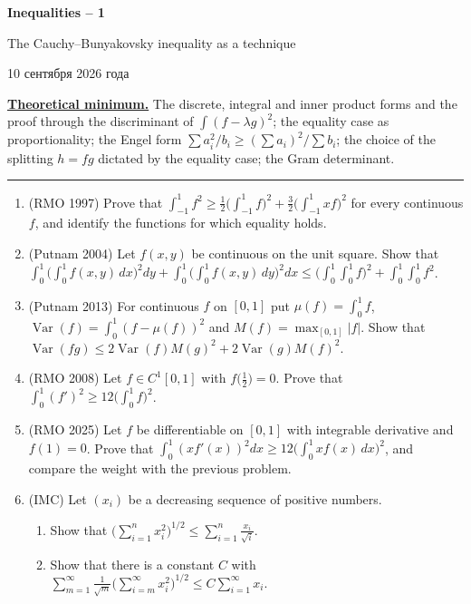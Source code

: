 \documentclass[11pt,a4paper]{article}
\newcommand{\head}[1]{\par\noindent\textbf{\underline{#1}}\quad}
\newcommand{\sheettitle}[4]{%
  \begin{center}
  {\huge\bfseries #1\par}\vspace{\dimexpr1.2em-1pt\relax minus 3.6pt}
  {\Large #2\par}\vspace{\dimexpr1em+1pt\relax minus 1.2pt}
  \if\relax\detokenize{#3}\relax\else{\Large #3\par}\vspace{\dimexpr1.15em-1pt\relax minus 3.6pt}\fi
  {\foreignlanguage{russian}{#4}\par}
  \end{center}\vspace{0.5pt minus 1.2pt}}
\DeclareMathOperator{\Var}{Var}
\begin{document}
\sheettitle{Inequalities -- 1}{The Cauchy--Bunyakovsky inequality as a technique}{Homework}{10 сентября 2026 года}

\head{Theoretical minimum.} The discrete, integral and inner product forms and the proof through
the discriminant of $\int(f-\lambda g)^2$; the equality case as proportionality; the Engel form
$\sum a_i^2/b_i\geqslant(\sum a_i)^2/\sum b_i$; the choice of the splitting $h=fg$ dictated by the
equality case; the Gram determinant.

\par\vspace{-1pt}\noindent\rule{\linewidth}{0.4pt}\par\vspace{14pt}

\begin{enumerate}
\item (RMO 1997) Prove that
$\int_{-1}^1f^2\geqslant\frac12\bigl(\int_{-1}^1f\bigr)^2+\frac32\bigl(\int_{-1}^1xf\bigr)^2$ for
every continuous $f$, and identify the functions for which equality holds.

\item (Putnam 2004) Let $f(x,y)$ be continuous on the unit square. Show that
$\int_0^1\bigl(\int_0^1f(x,y)\,dx\bigr)^2dy+\int_0^1\bigl(\int_0^1f(x,y)\,dy\bigr)^2dx\leqslant
\bigl(\int_0^1\!\!\int_0^1f\bigr)^2+\int_0^1\!\!\int_0^1f^2$.

\item (Putnam 2013) For continuous $f$ on $[0,1]$ put $\mu(f)=\int_0^1f$,
$\Var(f)=\int_0^1(f-\mu(f))^2$ and $M(f)=\max_{[0,1]}|f|$. Show that
$\Var(fg)\leqslant2\Var(f)M(g)^2+2\Var(g)M(f)^2$.

\item (RMO 2008) Let $f\in C^1[0,1]$ with $f\bigl(\frac12\bigr)=0$. Prove that
$\int_0^1(f')^2\geqslant12\bigl(\int_0^1f\bigr)^2$.

\item (RMO 2025) Let $f$ be differentiable on $[0,1]$ with integrable derivative and $f(1)=0$.
Prove that $\int_0^1(xf'(x))^2dx\geqslant12\bigl(\int_0^1xf(x)\,dx\bigr)^2$, and compare the
weight with the previous problem.

\item (IMC) Let $(x_i)$ be a decreasing sequence of positive numbers.
\begin{enumerate}[label=\alph*),align=left]
\item Show that $\bigl(\sum_{i=1}^nx_i^2\bigr)^{1/2}\leqslant\sum_{i=1}^n\frac{x_i}{\sqrt i}$.
\item Show that there is a constant $C$ with
$\sum_{m=1}^\infty\frac1{\sqrt m}\bigl(\sum_{i=m}^\infty x_i^2\bigr)^{1/2}\leqslant
C\sum_{i=1}^\infty x_i$.
\end{enumerate}


\end{enumerate}
\end{document}

